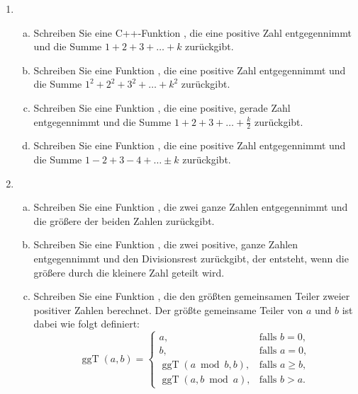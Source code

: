 \newcommand{\setfontsize}{11pt}

\lofoot{}

\begin{enumerate}[1.]
	\item \begin{enumerate}[a)]
		\item Schreiben Sie eine C++-Funktion , die eine positive Zahl  entgegennimmt und die Summe $1 + 2 + 3 + \dots + k$ zurückgibt.
		\item Schreiben Sie eine Funktion , die eine positive Zahl  entgegennimmt und die Summe $1^2 + 2^2 + 3^2 + \dots + k^2$ zurückgibt.
		\item Schreiben Sie eine Funktion , die eine positive, gerade Zahl  entgegennimmt und die Summe $1 + 2 + 3 + \dots + \frac{k}{2}$ zurückgibt.
		\item Schreiben Sie eine Funktion , die eine positive Zahl  entgegennimmt und die Summe $1 - 2 + 3 - 4 + \dots \pm k$ zurückgibt.
	\end{enumerate}
	\item \begin{enumerate}[a)]
		\item Schreiben Sie eine Funktion , die zwei ganze Zahlen entgegennimmt und die größere der beiden Zahlen zurückgibt.
		\item Schreiben Sie eine Funktion , die zwei positive, ganze Zahlen entgegennimmt und den Divisionsrest zurückgibt, der entsteht, wenn die größere durch die kleinere Zahl geteilt wird.
		\item Schreiben Sie eine Funktion , die den größten gemeinsamen Teiler zweier positiver Zahlen berechnet. Der größte gemeinsame Teiler von $a$ und $b$ ist dabei wie folgt definiert:
		\[
			\operatorname{ggT}(a,b) = \begin{cases}
				a, & \text{falls } b = 0, \\
				b, & \text{falls } a = 0, \\
				\operatorname{ggT}(a \bmod b, b), & \text{falls } a \geq b, \\
				\operatorname{ggT}(a, b \bmod a), & \text{falls } b > a.
			\end{cases}
		\]
	\end{enumerate}	
\end{enumerate}
